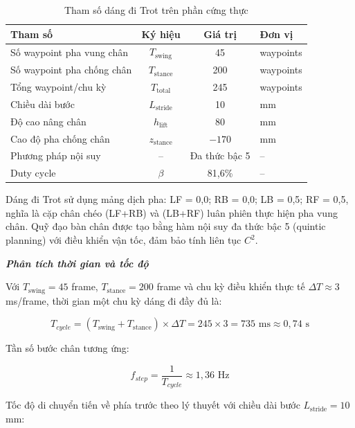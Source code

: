 \begin{table}[H]
\centering
\caption{Tham số dáng đi Trot trên phần cứng thực}
\label{tab:hw_gait_params}
\renewcommand{\arraystretch}{1.3}
\begin{tabular}{|l|c|c|l|}
\hline
\textbf{Tham số} & \textbf{Ký hiệu} & \textbf{Giá trị} & \textbf{Đơn vị} \\ \hline
Số waypoint pha vung chân & $T_{\text{swing}}$ & 45 & waypoints \\ \hline
Số waypoint pha chống chân & $T_{\text{stance}}$ & 200 & waypoints \\ \hline
Tổng waypoint/chu kỳ & $T_{\text{total}}$ & 245 & waypoints \\ \hline
Chiều dài bước & $L_{\text{stride}}$ & 10 & mm \\ \hline
Độ cao nâng chân & $h_{\text{lift}}$ & 80 & mm \\ \hline
Cao độ pha chống chân & $z_{\text{stance}}$ & $-170$ & mm \\ \hline
Phương pháp nội suy & -- & Đa thức bậc 5 & -- \\ \hline
Duty cycle & $\beta$ & 81,6\% & -- \\ \hline
\end{tabular}
\end{table}

Dáng đi Trot sử dụng mảng dịch pha: LF = 0,0; RB = 0,0; LB = 0,5; RF = 0,5, nghĩa là cặp chân chéo (LF+RB) và (LB+RF) luân phiên thực hiện pha vung chân. Quỹ đạo bàn chân được tạo bằng hàm nội suy đa thức bậc 5 (quintic planning) với điều khiển vận tốc, đảm bảo tính liên tục $C^2$.

\textbf{\textit{Phân tích thời gian và tốc độ}} 

Với $T_{\text{swing}} = 45$ frame, $T_{\text{stance}} = 200$ frame và chu kỳ điều khiển thực tế $\Delta T \approx 3$ ms/frame, thời gian một chu kỳ dáng đi đầy đủ là:

\begin{equation}
    T_{cycle} = (T_{\text{swing}} + T_{\text{stance}}) \times \Delta T = 245 \times 3 = 735 \text{ ms} \approx 0{,}74 \text{ s}
\end{equation}

Tần số bước chân tương ứng:

\begin{equation}
    f_{step} = \frac{1}{T_{cycle}} \approx 1{,}36 \text{ Hz}
\end{equation}

Tốc độ di chuyển tiến về phía trước theo lý thuyết với chiều dài bước $L_{\text{stride}} = 10$ mm:

